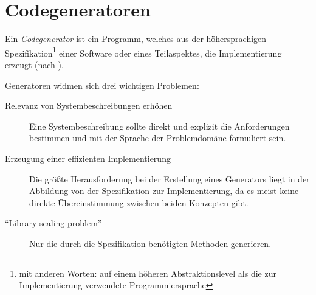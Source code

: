 \section{Codegeneratoren}
\label{sec:codegenerators}

Ein \emph{Codegenerator} ist ein Programm, welches aus der höhersprachigen Spezifikation\footnote{mit anderen Worten: auf einem höheren Abstraktionslevel als die zur Implementierung verwendete Programmiersprache} einer Software oder eines Teilaspektes, die Implementierung erzeugt (nach \cite{czarnecki2000generative}).

Generatoren widmen sich drei wichtigen Problemen\cite{czarnecki2000generative}:
\begin{description}
    \item[Relevanz von Systembeschreibungen erhöhen] Eine Systembeschreibung sollte direkt und explizit die Anforderungen bestimmen und mit der Sprache der Problemdomäne formuliert sein.
    \item[Erzeugung einer effizienten Implementierung] Die größte Herausforderung bei der Erstellung eines Generators liegt in der Abbildung von der Spezifikation zur Implementierung, da es meist keine direkte Übereinstimmung zwischen beiden Konzepten gibt.
    \item[\enquote{Library scaling problem}] Nur die durch die Spezifikation benötigten Methoden generieren.
\end{description}

